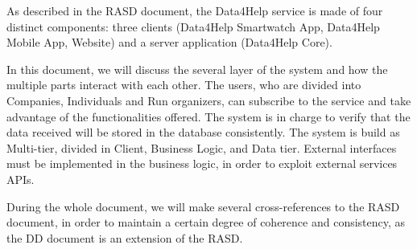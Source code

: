 As described in the RASD document, the Data4Help service is made of four distinct components: three clients (Data4Help Smartwatch App, Data4Help Mobile App, Website) and a server application (Data4Help Core).

In this document, we will discuss the several layer of the system and how the multiple parts interact with each other. 
The users, who are divided into Companies, Individuals and Run organizers, can subscribe to the service and take advantage of the functionalities offered.
The system is in charge to verify that the data received will be stored in the database consistently.
The system is build as Multi-tier, divided in Client, Business Logic, and Data tier. External interfaces must be implemented in the business logic, in order to exploit external services APIs.

During the whole document, we will make several cross-references to the RASD document, in order to maintain a certain degree of coherence and consistency, as the DD document is an extension of the RASD.

